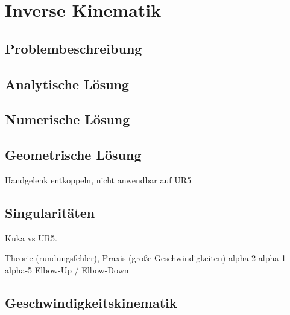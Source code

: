 \cleardoublepage
\chapter{Inverse Kinematik}

\section{Problembeschreibung}

\section{Analytische Lösung}

\section{Numerische Lösung}

\section{Geometrische Lösung}

Handgelenk entkoppeln, nicht anwendbar auf UR5

\section{Singularitäten}

Kuka vs UR5.

Theorie (rundungsfehler), Praxis (große Geschwindigkeiten)
alpha-2
alpha-1
alpha-5
Elbow-Up / Elbow-Down

\section{Geschwindigkeitskinematik}